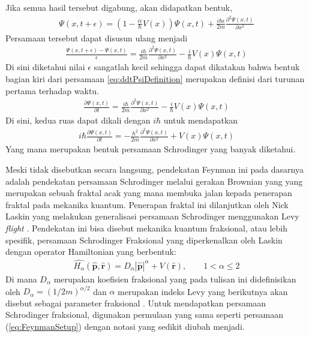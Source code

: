 Jika semua hasil tersebut digabung, akan didapatkan bentuk,
\begin{align}
    \Psi(x,t+\epsilon) = \left(1-\frac{i\epsilon}{\hbar}V(x)\right)\Psi(x,t) + \frac{i\hbar\epsilon}{2m}\frac{\partial^2\Psi(x,t)}{\partial x^2}
\end{align}
Persamaan tersebut dapat disusun ulang menjadi
\begin{align}
    \frac{\Psi(x,t+\epsilon)-\Psi(x,t)}{\epsilon} = \frac{i\hbar}{2m} \frac{\partial^2\Psi(x,t)}{\partial x^2} - \frac{i}{\hbar}V(x)\Psi(x,t)
    \label{eq:ddtPsiDefinition}
\end{align}
Di sini diketahui nilai \(\epsilon\) sangatlah kecil sehingga dapat dikatakan bahwa bentuk bagian kiri dari persamaan \ref{eq:ddtPsiDefinition} merupakan definisi dari turunan pertama terhadap waktu. 
\begin{align}
    \frac{\partial\Psi(x,t)}{\partial t} = \frac{i\hbar}{2m}\frac{\partial^2\Psi(x,t)}{\partial x^2} - \frac{i}{\hbar}V(x)\Psi(x,t)
\end{align}
Di sini, kedua ruas dapat dikali dengan \(i\hbar\) untuk mendapatkan
\begin{align}
    i\hbar\frac{\partial\Psi(x,t)}{\partial t} = -\frac{\hbar^2}{2m} \frac{\partial^2\Psi(x,t)}{\partial x^2} + V(x)\Psi(x,t)
    \label{eq:Schrodinger}
\end{align}
Yang mana merupakan bentuk persamaan Schrodinger yang banyak diketahui. \cite{Derbes1996Feynman}
\par Meski tidak disebutkan secara langsung, pendekatan Feynman ini pada dasarnya adalah pendekatan persamaan Schrodinger melalui gerakan Brownian yang yang merupakan sebuah fraktal acak yang mana membuka jalan kepada penerapan fraktal pada mekanika kuantum. Penerapan fraktal ini dilanjutkan oleh Nick Laskin yang melakukan generalisasi persamaan Schrodinger menggunakan Levy \textit{flight} \cite{Herrmann2014Fractional}. Pendekatan ini bisa disebut mekanika kuantum fraksional, atau lebih spesifik, persamaan Schrodinger Fraksional yang diperkenalkan oleh Laskin dengan operator Hamiltonian yang berbentuk:
\begin{align}
    \hat{H_\alpha}(\hat{\textbf{p}}, \hat{\textbf{r}}) = D_\alpha|\hat{\textbf{p}}|^\alpha + V(\hat{\textbf{r}}), \qquad 1<\alpha\leq 2 \label{eq:FractionalHamiltonian}
\end{align}
Di mana \(D_\alpha\) merupakan koefisien fraksional yang pada tulisan ini didefinisikan oleh \(D_\alpha = (1/2m)^{\alpha/2}\) dan \(\alpha\) merupakan indeks Levy yang berikutnya akan disebut sebagai parameter fraksional \cite{Xia2024Performance}. Untuk mendapatkan persamaan Schrodinger fraksional, digunakan permulaan yang sama seperti persamaan (\ref{eq:FeynmanSetup}) dengan notasi yang sedikit diubah menjadi.
